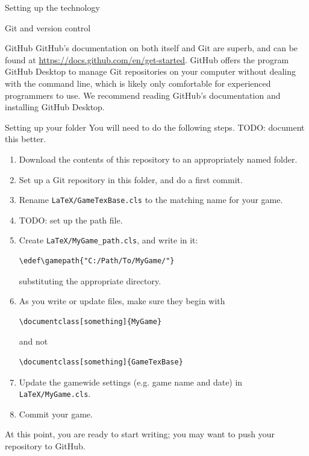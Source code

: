 \documentclass[sheet]{GameTexBase}
\begin{document}
\begin{section}{Setting up the technology}
\begin{subsection}{Git and version control}
\begin{subsubsection}{GitHub}
GitHub's documentation on both itself and Git are superb, and can be found at \url{https://docs.github.com/en/get-started}.  GitHub offers the program GitHub Desktop to manage Git repositories on your computer without dealing with the command line, which is likely only comfortable for experienced programmers to use.  We recommend reading GitHub's documentation and installing GitHub Desktop.
\end{subsubsection}
\end{subsection}
\begin{subsection}{Setting up your \gametex{} folder}
You will need to do the following steps.  TODO: document this better.
\begin{enumerate}
\item Download the contents of this repository to an appropriately named folder.
\item Set up a Git repository in this folder, and do a first commit.
\item Rename \lstinline|LaTeX/GameTexBase.cls| to the matching name for your game.
\item TODO: set up the path file.
\item Create \lstinline|LaTeX/MyGame_path.cls|, and write in it:
\begin{verbatim}
\edef\gamepath{"C:/Path/To/MyGame/"}
\end{verbatim}
substituting the appropriate directory.
\item As you write or update files, make sure they begin with
\begin{verbatim}
\documentclass[something]{MyGame}
\end{verbatim}
and not
\begin{verbatim}
\documentclass[something]{GameTexBase}
\end{verbatim}
\item Update the gamewide settings (e.g. game name and date) in \lstinline|LaTeX/MyGame.cls|.
\item Commit your game.
\end{enumerate}
At this point, you are ready to start writing; you may want to push your repository to GitHub.
\end{subsection}
\end{section}
\end{document}
